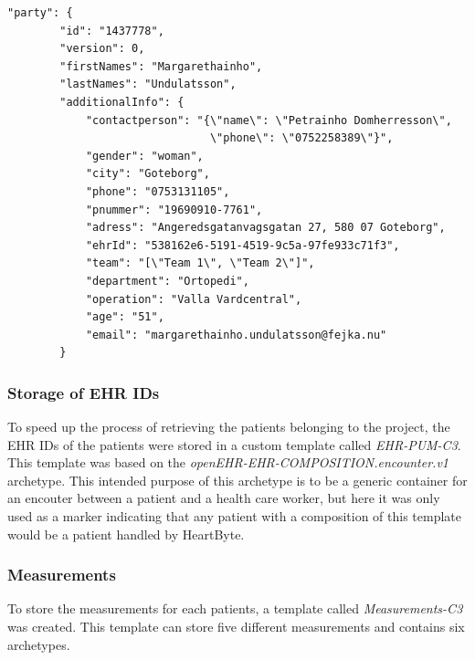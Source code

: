 \documentclass{article}
\begin{document}
\begin{lstlisting}
"party": {
        "id": "1437778",
        "version": 0,
        "firstNames": "Margarethainho",
        "lastNames": "Undulatsson",
        "additionalInfo": {
            "contactperson": "{\"name\": \"Petrainho Domherresson\",
                               \"phone\": \"0752258389\"}",
            "gender": "woman",
            "city": "Goteborg",
            "phone": "0753131105",
            "pnummer": "19690910-7761",
            "adress": "Angeredsgatanvagsgatan 27, 580 07 Goteborg",
            "ehrId": "538162e6-5191-4519-9c5a-97fe933c71f3",
            "team": "[\"Team 1\", \"Team 2\"]",
            "department": "Ortopedi",
            "operation": "Valla Vardcentral",
            "age": "51",
            "email": "margarethainho.undulatsson@fejka.nu"
        }
\end{lstlisting}

\subsubsection{Storage of EHR IDs}
To speed up the process of retrieving the patients belonging to the project, the EHR IDs of the patients were stored in a custom template called \emph{EHR-PUM-C3}. This template was based on the \emph{openEHR-EHR-COMPOSITION.encounter.v1} archetype. This intended purpose of this archetype is to be a generic container for an encouter between a patient and a health care worker, but here it was only used as a marker indicating that any patient with a composition of this template would be a patient handled by HeartByte.

\subsubsection{Measurements}
To store the measurements for each patients, a template called \emph{Measurements-C3} was created. This template can store five different measurements and contains six archetypes.
\end{document}
